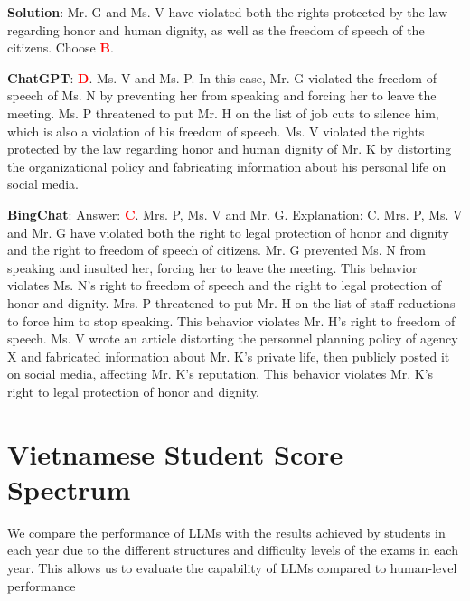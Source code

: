\documentclass{article}
\begin{document}
{\begin{mdframed}[linewidth=1pt,linecolor=red]
		\textbf{Solution}: Mr. G and Ms. V have violated both the rights protected by the law regarding honor and human dignity, as well as the freedom of speech of the citizens. Choose \textcolor{red}{\textbf{B}}. 
		
		\textbf{ChatGPT}: \textcolor{red}{\textbf{D}}. Ms. V and Ms. P. In this case, Mr. G violated the freedom of speech of Ms. N by preventing her from speaking and forcing her to leave the meeting. Ms. P threatened to put Mr. H on the list of job cuts to silence him, which is also a violation of his freedom of speech. Ms. V violated the rights protected by the law regarding honor and human dignity of Mr. K by distorting the organizational policy and fabricating information about his personal life on social media.
		
		\textbf{BingChat}: Answer: \textcolor{red}{\textbf{C}}. Mrs. P, Ms. V and Mr. G. Explanation: C. Mrs. P, Ms. V and Mr. G have violated both the right to legal protection of honor and dignity and the right to freedom of speech of citizens. Mr. G prevented Ms. N from speaking and insulted her, forcing her to leave the meeting. This behavior violates Ms. N’s right to freedom of speech and the right to legal protection of honor and dignity. Mrs. P threatened to put Mr. H on the list of staff reductions to force him to stop speaking. This behavior violates Mr. H’s right to freedom of speech. Ms. V wrote an article distorting the personnel planning policy of agency X and fabricated information about Mr. K’s private life, then publicly posted it on social media, affecting Mr. K’s reputation. This behavior violates Mr. K’s right to legal protection of honor and dignity.
		
	\end{mdframed}
	
	
	
	\newpage
		
	\section{Vietnamese Student Score Spectrum} 
	\label{sec:Score Spectrum}
	
	We compare the performance of LLMs with the results achieved by students in each year due to the different structures and difficulty levels of the exams in each year. This allows us to evaluate the capability of LLMs compared to human-level performance
	
}
\end{document}
